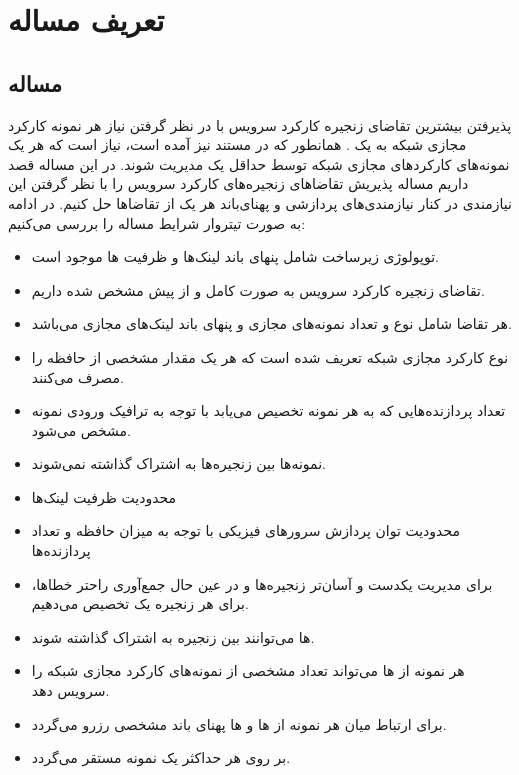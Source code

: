 \chapter{تعریف مساله}

\section{مساله}
پذیرفتن بیشترین تقاضای زنجیره‌ کارکرد سرویس با در نظر گرفتن نیاز هر نمونه کارکرد مجازی شبکه به یک .
همانطور که در مستند \cite{ETSI-MAN} نیز آمده است، نیاز است که هر یک نمونه‌های کارکردهای مجازی شبکه
توسط حداقل یک  مدیریت شوند.
در این مساله قصد داریم مساله پذیریش تقاضاهای زنجیره‌های کارکرد سرویس را با نظر گرفتن این نیازمندی در کنار
نیازمندی‌های پردازشی و پهنای‌باند هر یک از تقاضاها حل کنیم.
در ادامه به صورت تیتروار شرایط مساله را بررسی می‌کنیم:

\begin{itemize}
    \item توپولوژی زیرساخت شامل پنهای باند لینک‌ها و ظرفیت ها موجود است.
    \item {} تقاضای زنجیره‌ کارکرد سرویس به صورت کامل و از پیش مشخص شده داریم.
    \item هر تقاضا شامل نوع و تعداد نمونه‌های مجازی و پنهای باند لینک‌های مجازی می‌باشد.
    \item {} نوع کارکرد مجازی شبکه تعریف شده است که هر یک مقدار مشخصی از حافظه را مصرف می‌کنند.
    \item تعداد پردازنده‌هایی که به هر نمونه تخصیص می‌یابد با توجه به ترافیک ورودی نمونه مشخص می‌شود.
    \item نمونه‌ها بین زنجیره‌ها به اشتراک گذاشته نمی‌شوند.
    \item محدودیت ظرفیت لینک‌ها
    \item محدودیت توان پردازش سرورهای فیزیکی با توجه به میزان حافظه و تعداد پردازنده‌ها
    \item برای مدیریت یکدست و آسان‌تر زنجیره‌ها و در عین حال جمع‌آوری راحتر خطاها، برای هر زنجیره یک  تخصیص می‌دهیم.
    \item {}ها می‌توانند بین زنجیره به اشتراک گذاشته شوند.
    \item هر نمونه از ها می‌تواند تعداد مشخصی از نمونه‌های کارکرد مجازی شبکه را سرویس دهد. 
    \item برای ارتباط میان هر نمونه از ها و ها پهنای باند مشخصی رزرو می‌گردد.
    \item بر روی هر  حداکثر یک نمونه  مستقر می‌گردد.
\end{itemize}


